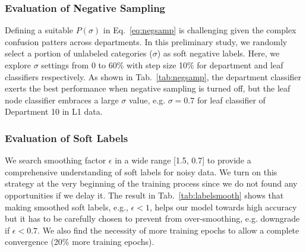 \documentclass[11pt,dvipsnames]{article}
\begin{document}
\subsubsection{Evaluation of Negative Sampling}
Defining a suitable $P(\sigma)$ in Eq.~\ref{eq:negsamp} is challenging given the complex confusion patters across departments. In this preliminary study, we randomly select a portion of unlabeled categories ($\sigma$) as soft negative labels. Here, we explore $\sigma$ settings from 0 to 60\% with step size 10\% for department and leaf classifiers respectively. As shown in Tab.~\ref{tab:negsamp}, the department classifier exerts the best performance when negative sampling is turned off, but the leaf node classifier embraces a large $\sigma$ value, e.g. $\sigma=0.7$ for leaf classifier of Department 10 in L1 data. 

\begin{table}[]
    \centering
    \caption{Influence of negative sampling in department/leaf classification. Improvement (+) or Downgrade (-). }
    \label{tab:negsamp}
\end{table}


\subsubsection{Evaluation of Soft Labels}
We search smoothing factor $\epsilon$ in a wide range [1.5, 0.7] to provide a comprehensive understanding of soft labels for noisy data. We turn on this strategy at the very beginning of the training process since we do not found any opportunities if we delay it. The result in Tab.~\ref{tab:labelsmooth} shows that making smoothed soft labels, e.g., $\epsilon<1$, helps our model towards high accuracy but it has to be carefully chosen to prevent from over-smoothing, e.g. downgrade if $\epsilon<0.7$. We also find the necessity of more training epochs to allow a complete convergence (20\% more training epochs).
\end{document}
